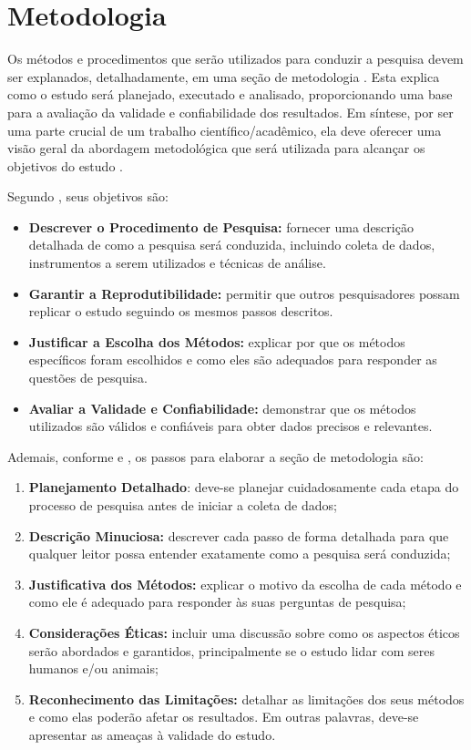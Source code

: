 \section{Metodologia}\label{sec:metodologia}

Os métodos e procedimentos que serão utilizados para conduzir a pesquisa devem ser explanados, detalhadamente, em uma seção de metodologia \cite{Wazlawick2021}. Esta explica como o estudo será planejado, executado e analisado, proporcionando uma base para a avaliação da validade e confiabilidade dos resultados. Em síntese, por ser uma parte crucial de um trabalho científico/acadêmico, ela deve oferecer uma visão geral da abordagem metodológica que será utilizada para alcançar os objetivos do estudo \cite{Marconi2021}.

Segundo , seus objetivos são:
\begin{itemize}[nosep, leftmargin=2.3cm]
    \item \textbf{Descrever o Procedimento de Pesquisa:} fornecer uma descrição detalhada de como a pesquisa será conduzida, incluindo coleta de dados, instrumentos a serem utilizados e técnicas de análise.
    \item \textbf{Garantir a Reprodutibilidade:} permitir que outros pesquisadores possam replicar o estudo seguindo os mesmos passos descritos.
    \item \textbf{Justificar a Escolha dos Métodos:} explicar por que os métodos específicos foram escolhidos e como eles são adequados para responder as questões de pesquisa.
    \item \textbf{Avaliar a Validade e Confiabilidade:} demonstrar que os métodos utilizados são válidos e confiáveis para obter dados precisos e relevantes.
\end{itemize}

Ademais, conforme  e , os passos para elaborar a seção de metodologia são:
\begin{enumerate}[label=\roman*., nosep, leftmargin=2.3cm]
    \item \textbf{Planejamento Detalhado}: deve-se planejar cuidadosamente cada etapa do processo de pesquisa antes de iniciar a coleta de dados;
    \item \textbf{Descrição Minuciosa:} descrever cada passo de forma detalhada para que qualquer leitor possa entender exatamente como a pesquisa será conduzida;
    \item \textbf{Justificativa dos Métodos:} explicar o motivo da escolha de cada método e como ele é adequado para responder às suas perguntas de pesquisa;
    \item \textbf{Considerações Éticas:} incluir uma discussão sobre como os aspectos éticos serão abordados e garantidos, principalmente se o estudo lidar com seres humanos e/ou animais;
    \item \textbf{Reconhecimento das Limitações:} detalhar as limitações dos seus métodos e como elas poderão afetar os resultados. Em outras palavras, deve-se apresentar as ameaças à validade do estudo.
\end{enumerate}

